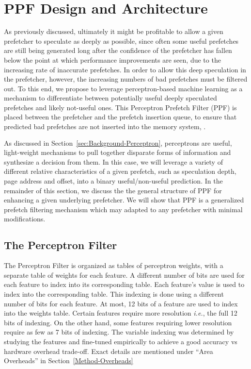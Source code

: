 \section{PPF Design and Architecture}
\label{Arch}

As previously discussed, ultimately it might be profitable to allow a
given prefetcher to speculate as deeply as possible, since often some
useful prefetches are still being generated long after the confidence
of the prefetcher has fallen below the point at which performance
improvements are seen, due to the increasing rate of inaccurate
prefetches.  In order to allow this deep speculation in the
prefetcher, however, the increasing numbers of bad prefetches must be
filtered out.  To this end, we propose to leverage perceptron-based
machine learning as a mechanism to differentiate between potentially
useful deeply speculated prefetches and likely not-useful ones.  This
Perceptron Prefetch Filter (PPF) is placed between the prefetcher and
the prefetch insertion queue, to ensure that predicted bad prefetches
are not inserted into the memory system, .

As discussed in Section~\ref{sec:Background-Perceptron}, perceptrons
are useful, light-weight mechanisms to pull together disparate forms
of information and synthesize a decision from them.  In this case, we
will leverage a variety of different relative characteristics of a
given prefetch, such as speculation depth, page address and offset,
into a binary useful/non-useful prediction.  In the remainder of this
section, we discuss the the general structure of PPF for enhancing a
given underlying prefetcher.  We will show that PPF is a generalized
prefetch filtering mechanism which may adapted to any prefetcher with
minimal modifications. %

\subsection{The Perceptron Filter}
\label{Arch-Perceptron}


The Perceptron Filter is organized as tables of perceptron weights,
with a separate table of weights for each feature.  A different number
of bits are used for each feature to index into its corresponding
table.
Each feature's value is used to index into the corresponding table.
This indexing is done using a different number of bits for each
feature.  At most, 12 bits of a feature are used to index into the
weights table. Certain features require more resolution \textit{i.e.},
the full 12 bits of indexing.  On the other hand, some features
requiring lower resolution require as few as 7 bits of indexing.  The
variable indexing was determined by studying the features and
fine-tuned empirically to achieve a good accuracy vs hardware overhead
trade-off.  Exact details are mentioned under ``Area Overheads'' in
Section~\ref{Method-Overheads}


